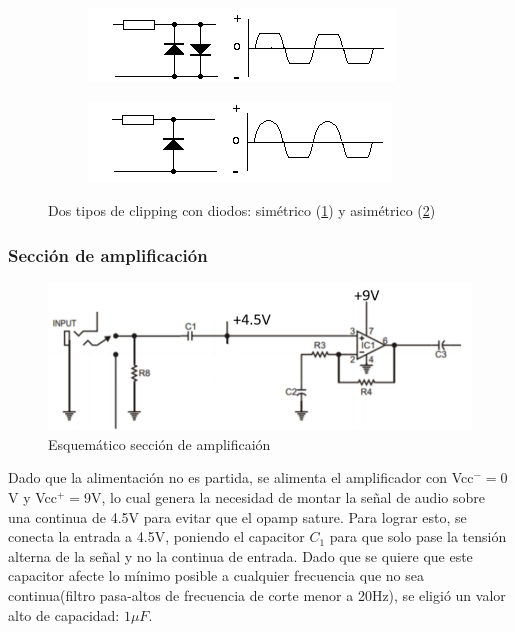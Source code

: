 \documentclass[../../main.tex]{subfiles}
\begin{document}
\begin{figure}[H]		%
	\centering
	\begin{subfigure}[b]{0.45\textwidth}
		\centering
		\includegraphics[scale=.8]{imagenes/diode_clipping_symmetrical.png}
		\caption{}
		\label{fig:ej5_diode_clipping_sym}
	\end{subfigure}
	\begin{subfigure}[b]{0.45\textwidth}
		\centering
		\includegraphics[scale=.8]{imagenes/diode_clipping_asymmetrical.png}
		\caption{ }
		\label{fig:ej5_diode_clipping_asym}
	\end{subfigure}
	\caption{Dos tipos de clipping con diodos: sim\'etrico (\ref{fig:ej5_diode_clipping_sym}) y asim\'etrico (\ref{fig:ej5_diode_clipping_asym})}
	\label{fig:ej5_diode_clipping}
\end{figure}


\subsubsection{Secci\'on de amplificaci\'on}

\begin{figure}[H]	%
	\centering
	\includegraphics[scale=1]{imagenes/esquematico_amplificacion.png}
	\caption{Esquem\'atico secci\'on de amplificai\'on}
	\label{fig:ej5_esquematico_amplificacion}
\end{figure}

Dado que la alimentaci\'on no es partida, se alimenta el amplificador con Vcc$^-=0$V y Vcc$^+=$9V, lo cual genera la necesidad de montar la se\~nal de audio sobre una continua de 4.5V para evitar que el opamp sature. Para lograr esto, se conecta la entrada a 4.5V, poniendo el capacitor $C_1$ para que solo pase la tensi\'on alterna de la se\~nal y no la continua de entrada. Dado que se quiere que este capacitor afecte lo mínimo posible a cualquier frecuencia que no sea continua(filtro pasa-altos de frecuencia de corte menor a 20Hz), se eligi\'o un valor alto de capacidad: $1\mu F$. \par
\end{document}
